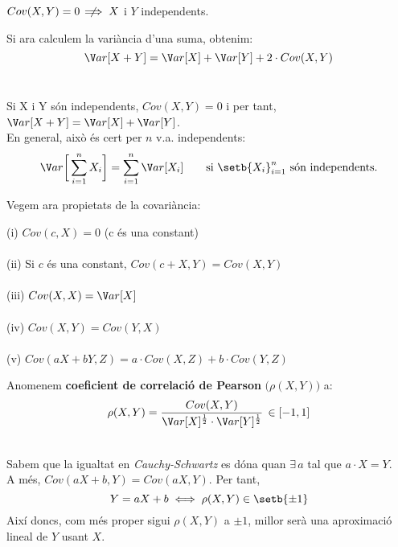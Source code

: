 \begin{obs}
  $Cov(X,Y) = 0 \hspace{0.2cm}\not\hspace{-0.25cm} \implies X$ i $Y$ independents. %
\end{obs}

Si ara calculem la variància d'una suma, obtenim: $$\V ar[X+Y] = \V ar[X] + \V ar[Y] + 2\cdot Cov(X,Y)$$ \\

\begin{obs}
  Si X i Y són independents, $Cov(X,Y) = 0$ i per tant, $\V ar[X+Y] = \V ar[X] + \V ar[Y]$. \\
  En general, això és cert per $n$ v.a. independents: 
  \[
    \V ar\bigg[\sum_{i=1}^{n}X_{i} \bigg] = \sum_{i=1}^{n}\V ar[X_{i}] \qquad \text{si } \setb{X_{i}}_{i=1}^{n} \text{ són independents}.
  \]
\end{obs}

\newpage
Vegem ara propietats de la covariància:

\begin{properties}
  (i) $Cov(c, X) = 0$ (c és una constant) \\\\
  (ii) Si $c$ és una constant, $Cov(c + X,Y) = Cov(X,Y)$ \\\\
  (iii) $Cov(X,X) = \V ar[X]$ \\\\
  (iv) $Cov(X,Y) = Cov(Y,X)$ \\\\
  (v) $Cov(aX+bY, Z) = a\cdot Cov(X,Z) + b\cdot Cov(Y,Z)$
\end{properties}

\begin{defi}
  Anomenem \textbf{coeficient de correlació de Pearson} $\big(\rho(X,Y)\big)$ a:
  \[
    \rho(X,Y) = \frac{Cov(X,Y)}{\V ar[X]^{\frac{1}{2}}\cdot \V ar[Y]^{\frac{1}{2}}} \, \in [-1,1]
  \]
\end{defi}

\begin{obs} \- \\
  Sabem que la igualtat en \textit{Cauchy-Schwartz} es dóna quan $\exists \, a$ tal que $a\cdot X = Y$. \\
  A més, $Cov(aX + b, Y) = Cov(aX, Y)$. 
  Per tant, $$Y=aX + b \iff \rho(X,Y) \in \setb{\pm 1}$$ Així doncs, com més proper sigui $\rho(X,Y)$ a $\pm 1$, millor serà una aproximació lineal de $Y$ usant $X$.
\end{obs}
